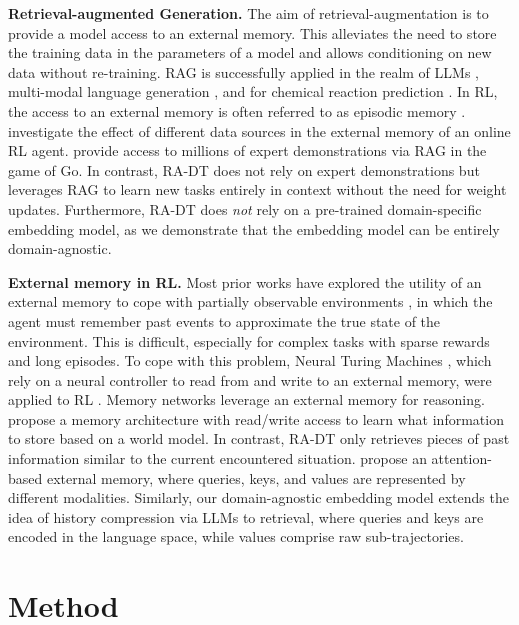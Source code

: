 \documentclass{article} %
\begin{document}
\textbf{Retrieval-augmented Generation.} 
The aim of retrieval-augmentation is to provide a model access to an external memory.
This alleviates the need to store the training data in the parameters of a model and allows conditioning on new data without re-training.
RAG is successfully applied in the realm of LLMs \citep{Khandelwal:19,Guu:20,Lewis:20,Borgeaud:22,Izacard:22,Ram:23}, multi-modal language generation \citep{hu_reveal_2023,yasunaga_retrieval_2023,yang_revilm_2023,ramos_smallcap_2022}, and for chemical reaction prediction \citep{Seidl:22}.
In RL, the access to an external memory is often referred to as episodic memory \citep{Sprechmann:18,Blundell:2016,Pritzel:2017}. 
\citet{Goyal:22} investigate the effect of different data sources in the external memory of an online RL agent. \citep{Humphreys:22} provide access to millions of expert demonstrations via RAG in the game of Go.
In contrast, RA-DT does not rely on expert demonstrations but leverages RAG to learn new tasks entirely in context without the need for weight updates.
Furthermore, RA-DT does \emph{not} rely on a pre-trained domain-specific embedding model, as we demonstrate that the embedding model can be entirely domain-agnostic.

\textbf{External memory in RL.}
Most prior works have explored the utility of an external memory to cope with partially observable environments \citep{Astrom:1965,Kaelbling:1998}, in which the agent must remember past events to approximate the true state of the environment.
This is difficult, especially for complex tasks with sparse rewards \citep{Medina:2019,Patil:22,Widrich:21} and long episodes.
To cope with this problem, Neural Turing Machines \citep{Graves:2014}, which rely on a neural controller to read from and write to an external memory, were applied to RL \citep{Zaremba:2015}.
Memory networks \citep{Weston:2015} leverage an external memory for reasoning.
\citet{Wayne:2018} propose a memory architecture with read/write access to learn what information to store based on a world model.
In contrast, RA-DT only retrieves pieces of past information similar to the current encountered situation.
\citet{Hill:2021} propose an attention-based external memory, where queries, keys, and values are represented by different modalities.
Similarly, our domain-agnostic embedding model extends the idea of history compression via LLMs \citep{Paischer:22,Paischer:23} to retrieval, where queries and keys are encoded in the language space, while values comprise raw sub-trajectories.

\section{Method}\label{sec:method}
\end{document}

